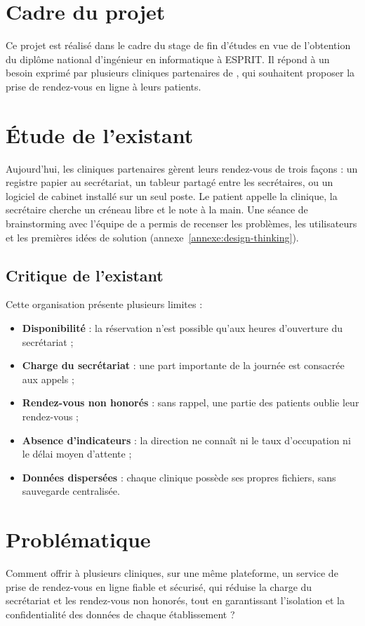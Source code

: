 \section{Cadre du projet}
Ce projet est réalisé dans le cadre du stage de fin d'études en vue de l'obtention du diplôme national d'ingénieur en informatique à ESPRIT. Il répond à un besoin exprimé par plusieurs cliniques partenaires de \entreprise, qui souhaitent proposer la prise de rendez-vous en ligne à leurs patients.

\section{Étude de l'existant}
Aujourd'hui, les cliniques partenaires gèrent leurs rendez-vous de trois façons : un registre papier au secrétariat, un tableur partagé entre les secrétaires, ou un logiciel de cabinet installé sur un seul poste. Le patient appelle la clinique, la secrétaire cherche un créneau libre et le note à la main. Une séance de brainstorming avec l'équipe de \entreprise{} a permis de recenser les problèmes, les utilisateurs et les premières idées de solution (annexe~\ref{annexe:design-thinking}).

\subsection{Critique de l'existant}
Cette organisation présente plusieurs limites :
\begin{itemize}
  \item \textbf{Disponibilité} : la réservation n'est possible qu'aux heures d'ouverture du secrétariat ;
  \item \textbf{Charge du secrétariat} : une part importante de la journée est consacrée aux appels ;
  \item \textbf{Rendez-vous non honorés} : sans rappel, une partie des patients oublie leur rendez-vous ; 
  \item \textbf{Absence d'indicateurs} : la direction ne connaît ni le taux d'occupation ni le délai moyen d'attente ;
  \item \textbf{Données dispersées} : chaque clinique possède ses propres fichiers, sans sauvegarde centralisée.
\end{itemize}

\section{Problématique}
Comment offrir à plusieurs cliniques, sur une même plateforme, un service de prise de rendez-vous en ligne fiable et sécurisé, qui réduise la charge du secrétariat et les rendez-vous non honorés, tout en garantissant l'isolation et la confidentialité des données de chaque établissement ?


